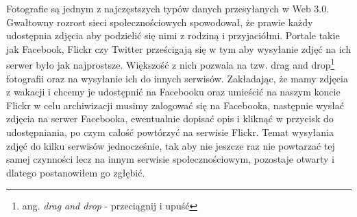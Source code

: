 \documentclass[brudnopis]{xmgr}
\begin{document}
\maketitle
%
\introduction
Fotografie są jednym z najczęstszych typów danych przesyłanych w Web 3.0. Gwałtowny rozrost sieci społecznościowych spowodował, że prawie każdy udostępnia zdjęcia aby podzielić się nimi z rodziną i przyjaciółmi. Portale takie jak Facebook, Flickr czy Twitter prześcigają się w tym aby wysyłanie zdjęć na ich serwer było jak najprostsze. Większość z nich pozwala na tzw. drag and drop\footnote{ang. \textit{drag and drop} - przeciągnij i upuść} fotografii oraz na wysyłanie ich do innych serwisów. Zakładając, że mamy zdjęcia z wakacji i chcemy je udostępnić na Facebooku oraz umieścić na naszym koncie Flickr w celu archiwizacji musimy zalogować się na Facebooka, następnie wysłać zdjęcia na serwer Facebooka, ewentualnie dopisać opis i kliknąć w przycisk do udostępniania, po czym całość powtórzyć na serwisie Flickr. Temat wysyłania zdjęć do kilku serwisów jednocześnie, tak aby nie jeszcze raz nie powtarzać tej samej czynności lecz na innym serwisie społecznościowym, pozostaje otwarty i dlatego postanowiłem go zgłębić. 
\end{document}
